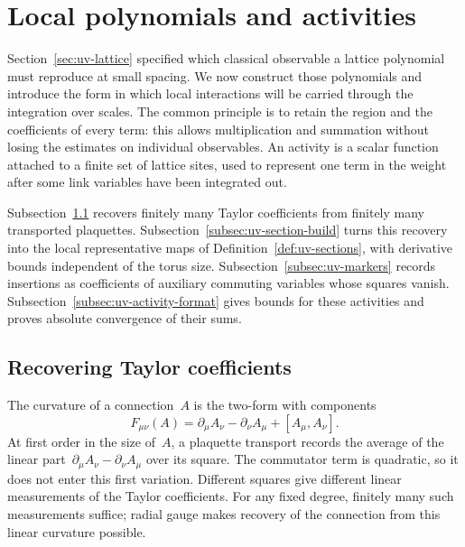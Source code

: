 \section{Local polynomials and activities}\label{sec:uv-activities}

Section~\ref{sec:uv-lattice} specified which classical observable a lattice polynomial must reproduce at small spacing.
We now construct those polynomials and introduce the form in which local interactions will be carried through the integration over scales.
The common principle is to retain the region and the coefficients of every term: this allows multiplication and summation without losing the estimates on individual observables.
An activity is a scalar function attached to a finite set of lattice sites, used to represent one term in the weight after some link variables have been integrated out.

Subsection~\ref{subsec:uv-sampling} recovers finitely many Taylor coefficients from finitely many transported plaquettes.
Subsection~\ref{subsec:uv-section-build} turns this recovery into the local representative maps of Definition~\ref{def:uv-sections}, with derivative bounds independent of the torus size.
Subsection~\ref{subsec:uv-markers} records insertions as coefficients of auxiliary commuting variables whose squares vanish.
Subsection~\ref{subsec:uv-activity-format} gives bounds for these activities and proves absolute convergence of their sums.

\subsection{Recovering Taylor coefficients}\label{subsec:uv-sampling}

The curvature of a connection~$A$ is the two-form with components
\begin{equation*}
 F_{\mu\nu}(A)=\partial_\mu A_\nu-\partial_\nu A_\mu+[A_\mu,A_\nu].
\end{equation*}
At first order in the size of~$A$, a plaquette transport records the average of the linear part~$\partial_\mu A_\nu-\partial_\nu A_\mu$ over its square. The commutator term is quadratic, so it does not enter this first variation.
Different squares give different linear measurements of the Taylor coefficients. For any fixed degree, finitely many such measurements suffice; radial gauge makes recovery of the connection from this linear curvature possible.

